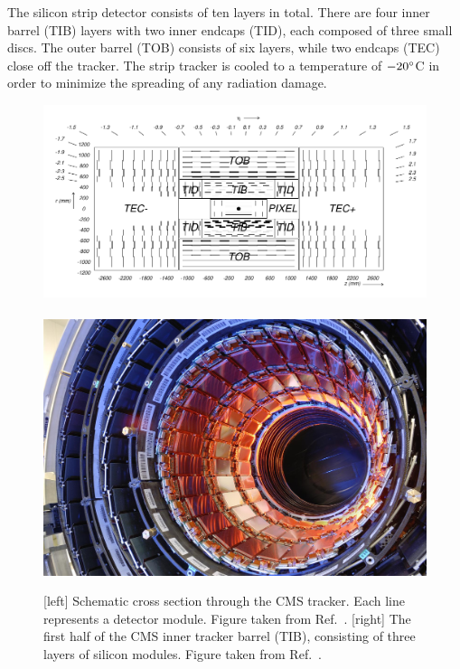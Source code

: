The silicon strip detector consists of ten layers in total. There are four inner barrel (TIB)
layers with two inner endcaps (TID), each composed of three small discs. The outer barrel (TOB)
consists of six layers, while two endcaps (TEC) close off the tracker. The strip tracker is
cooled to a temperature of $-20^\circ$C in order to minimize the spreading of any radiation
damage.

\begin{figure}[tpb]
  \centering
  \includegraphics[height=0.17\textheight]{figures/cms/CMS_tracker_general_layout}
  ~
  \includegraphics[height=0.17\textheight]{figures/cms/cms_tracker}
  \caption{[left] Schematic cross section through the CMS tracker. Each line represents a detector
module. Figure taken from Ref.~\cite{Chatrchyan:2008aa}. 
  [right] The first half of the CMS inner tracker barrel (TIB), consisting of three
layers of silicon modules. Figure taken from Ref.~\cite{CMS_tracker}.
  \label{fig:cms_tracker}}
\end{figure}

